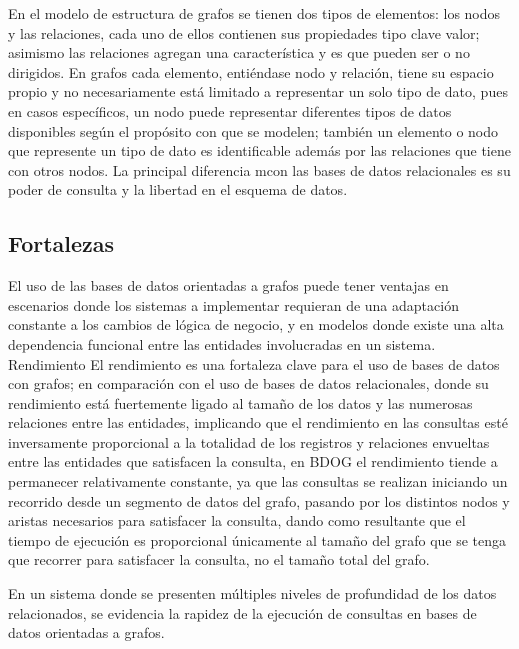 \documentclass[preprint,12pt]{elsarticle}
\begin{document}
En el modelo de estructura de grafos se tienen dos tipos de elementos: los nodos y las relaciones, cada uno de ellos contienen sus propiedades tipo clave valor; asimismo las relaciones agregan una característica y es que pueden ser o no dirigidos. En grafos cada elemento, entiéndase nodo y relación, tiene su espacio propio y no necesariamente está limitado a representar un solo tipo de dato, pues en casos específicos, un nodo puede representar diferentes tipos de datos disponibles según el propósito con que se modelen; también un elemento o nodo que represente un tipo de dato es identificable además por las relaciones que tiene con otros nodos. La principal diferencia mcon las bases de datos relacionales es su poder de consulta y la libertad en el esquema de datos.\\


\subsection{\textbf{Fortalezas}}
El uso de las bases de datos orientadas a grafos puede tener ventajas en escenarios donde los sistemas a implementar requieran de una adaptación constante a los cambios de lógica de negocio, y en modelos donde existe una alta dependencia funcional entre las entidades involucradas en un sistema. \\


Rendimiento
El rendimiento es una fortaleza clave para el uso de bases de datos con grafos; en comparación con el uso de bases de datos relacionales, donde su rendimiento está fuertemente ligado al tamaño de los datos y las numerosas relaciones entre las entidades, implicando que el rendimiento en las consultas esté inversamente proporcional a la totalidad de los registros y relaciones envueltas entre las entidades que satisfacen la consulta, en BDOG el rendimiento tiende a permanecer  relativamente constante, ya que las consultas se realizan iniciando un recorrido desde un segmento de datos del grafo, pasando por los distintos nodos y aristas necesarios para satisfacer la consulta, dando como resultante que el tiempo de ejecución es proporcional únicamente al tamaño del grafo que se tenga que recorrer para satisfacer la consulta, no el tamaño total del grafo.

En un sistema donde se presenten múltiples niveles de profundidad de los datos relacionados, se evidencia la rapidez de la ejecución de consultas en bases de datos orientadas a grafos. \\
\end{document}
